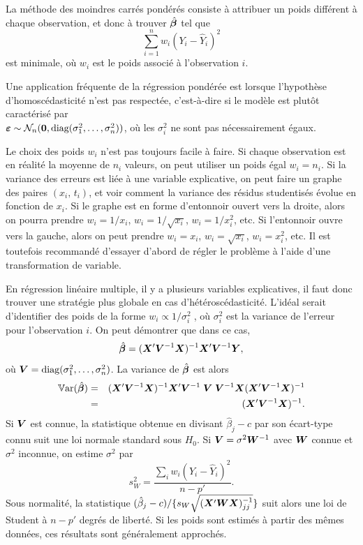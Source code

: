 La méthode des moindres carrés pondérés consiste \`a attribuer un poids différent  à chaque observation, et donc à trouver $\hat{\bm\beta}$ tel que
$$\sum_{i=1}^nw_i(Y_i-\hat{Y}_i)^2$$
est minimale, o\`u $w_i$ est le poids associé à l'observation $i$.

Une application fréquente de la régression pondérée est lorsque l'hypothèse d'homo\-scédasticité n'est pas respectée, c'est-à-dire si le modèle est plutôt caractérisé par \\$\bm\varepsilon\sim \mathcal{N}_n(\bm{0},\mbox{diag}(\sigma_1^2,\ldots,\sigma_n^2))$, o\`u les $\sigma_i^2$ ne sont pas nécessairement égaux.


Le choix des poids $w_i$ n'est pas toujours facile à faire. Si chaque observation est en réalité la moyenne de $n_i$ valeurs, on peut utiliser un poids égal $w_i=n_i$. Si la variance des erreurs est liée à une variable explicative, on peut faire un graphe des paires $(x_i,\, t_i)$, et voir
comment la variance des résidus studentisés évolue en
fonction de $x_i$. Si le graphe est en forme d'entonnoir ouvert
vers la droite, alors on pourra prendre $w_i=1/x_i$,
$w_i=1/\sqrt{x_i}$, $w_i=1/x_i^{2}$, etc. Si l'entonnoir ouvre vers
la gauche, alors on peut prendre $w_i=x_i$, $w_i=\sqrt{x_i}$,
$w_i=x_i^{2}$, etc. Il est toutefois recommandé d'essayer d'abord de régler le problème à l'aide d'une transformation de variable.

En régression linéaire multiple, il y a plusieurs variables explicatives, il faut donc trouver une stratégie plus globale en cas d'hétéroscédasticité. 
L'idéal serait d'identifier des poids de la forme $w_i\propto1/\sigma^2_i \;$, où $\sigma_i^2$ est la variance de l'erreur pour l'observation $i$. On peut démontrer que dans ce cas,
$$\hat{\bm\beta}=(\bm{X}'\bm{V}^{-1}\bm{X})^{-1}\bm{X}'\bm{V}^{-1}\bm{Y},$$
o\`u $\bm{V}=\mbox{diag}(\sigma_1^2,\ldots,\sigma_n^2)$. La variance de
$\hat{\bm\beta}$ est alors
\begin{eqnarray*}
\mathbb{V}\text{ar}(\hat{\bm\beta})&=&(\bm{X}'\bm{V}^{-1}\bm{X})^{-1}\bm{X}'\bm{V}^{-1}\;\bm{V}\;\bm{V}^{-1}\bm{X}(\bm{X}'\bm{V}^{-1}\bm{X})^{-1}\\
&=&(\bm{X}'\bm{V}^{-1}\bm{X})^{-1}.
\end{eqnarray*}
Si $\bm{V}$ est connue, la statistique obtenue en divisant
$\hat\beta_j-c$ par son écart-type connu suit une loi normale standard sous
$H_0$. Si $\bm{V}=\sigma^2{\bm{W}}^{-1}$ avec ${\bm{W}}$ connue et $\sigma^2$
inconnue, on estime $\sigma^2$ par
\[
 s_W^2=\frac{\sum_i w_i(Y_i-\hat Y_i)^2}{n-p'}.
\]
Sous normalité, la statistique
$(\hat\beta_j-c)/\{s_W\sqrt{(\bm{X}'{\bm{W}}\bm{X})^{-1}_{jj}}\}$ suit alors
une loi de Student à $n-p'$ degrés de liberté. Si les poids sont estimés à
partir des mêmes données, ces résultats sont généralement approchés.

